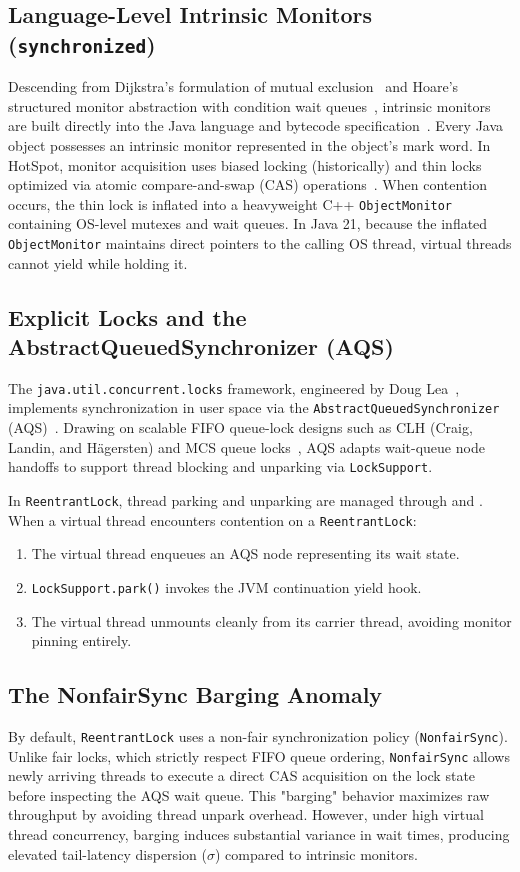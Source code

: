 \subsection{Language-Level Intrinsic Monitors (\texttt{synchronized})}
Descending from Dijkstra's formulation of mutual exclusion~\cite{Dijkstra1965} and Hoare's structured monitor abstraction with condition wait queues~\cite{Hoare1974}, intrinsic monitors are built directly into the Java language and bytecode specification~\cite{JLS21,JVMS21}. Every Java object possesses an intrinsic monitor represented in the object's mark word. In HotSpot, monitor acquisition uses biased locking (historically) and thin locks optimized via atomic compare-and-swap (CAS) operations~\cite{Bacon2001}. When contention occurs, the thin lock is inflated into a heavyweight C++ \texttt{ObjectMonitor} containing OS-level mutexes and wait queues. In Java 21, because the inflated \texttt{ObjectMonitor} maintains direct pointers to the calling OS thread, virtual threads cannot yield while holding it.

\subsection{Explicit Locks and the AbstractQueuedSynchronizer (AQS)}
The \texttt{java.util.concurrent.locks} framework, engineered by Doug Lea~\cite{Lea2000}, implements synchronization in user space via the \texttt{AbstractQueuedSynchronizer} (AQS)~\cite{Lea2005AQS}. Drawing on scalable FIFO queue-lock designs such as CLH (Craig, Landin, and H{\"a}gersten) and MCS queue locks~\cite{MellorCrummey1991}, AQS adapts wait-queue node handoffs to support thread blocking and unparking via \texttt{LockSupport}.

In \texttt{ReentrantLock}, thread parking and unparking are managed through  and . When a virtual thread encounters contention on a \texttt{ReentrantLock}:
\begin{enumerate}
  \item The virtual thread enqueues an AQS node representing its wait state.
  \item \texttt{LockSupport.park()} invokes the JVM continuation yield hook.
  \item The virtual thread unmounts cleanly from its carrier thread, avoiding monitor pinning entirely.
\end{enumerate}

\subsection{The NonfairSync Barging Anomaly}
By default, \texttt{ReentrantLock} uses a non-fair synchronization policy (\texttt{NonfairSync}). Unlike fair locks, which strictly respect FIFO queue ordering, \texttt{NonfairSync} allows newly arriving threads to execute a direct CAS acquisition on the lock state before inspecting the AQS wait queue. This "barging" behavior maximizes raw throughput by avoiding thread unpark overhead. However, under high virtual thread concurrency, barging induces substantial variance in wait times, producing elevated tail-latency dispersion ($\sigma$) compared to intrinsic monitors.

